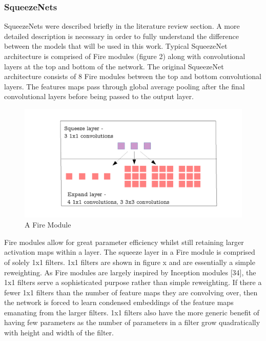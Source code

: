 \documentclass{article}
\begin{document}
\subsubsection{SqueezeNets}
SqueezeNets were described briefly in the literature review section. A more detailed description is necessary in order to fully understand the difference between the models that will be used in this work. Typical SqueezeNet architecture is comprised of Fire modules (figure 2) along with convolutional layers at the top and bottom of the network. The original SqueezeNet architecture consists of 8 Fire modules between the top and bottom convolutional layers. The features maps pass through global average pooling after the final convolutional layers before being passed to the output layer.\\

\begin{figure}[!b]
  \includegraphics[width=\linewidth]{fire.pdf}
  \caption{A Fire Module}
  \label{fig:dwconvolution}
\end{figure}


Fire modules allow for great parameter efficiency whilst still retaining larger activation maps within a layer. The squeeze layer in a Fire module is comprised of solely 1x1 filters. 1x1 filters are shown in figure x and are essentially a simple reweighting. As Fire modules are largely inspired by Inception modules [34], the 1x1 filters serve a sophisticated purpose rather than simple reweighting. If there a fewer 1x1 filters than the number of feature maps they are convolving over, then the network is forced to learn condensed embeddings of the feature maps emanating from the larger filters. 1x1 filters also have the more generic benefit of having few parameters as the number of parameters in a filter grow quadratically with height and width of the filter.\\
\end{document}
